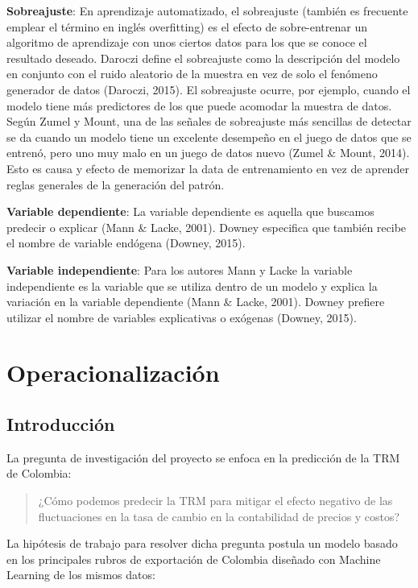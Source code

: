 \textbf{Sobreajuste}: En aprendizaje automatizado, el sobreajuste (también es frecuente emplear el término en inglés overfitting) es el efecto de sobre-entrenar un algoritmo de aprendizaje con unos ciertos datos para los que se conoce el resultado deseado. Daroczi define el sobreajuste como la descripción del modelo en conjunto con el ruido aleatorio de la muestra en vez de solo el fenómeno generador de datos (Daroczi, 2015). El sobreajuste ocurre, por ejemplo, cuando el modelo tiene más predictores de los que puede acomodar la muestra de datos. Según Zumel y Mount, una de las señales de sobreajuste más sencillas de detectar se da cuando un modelo tiene un excelente desempeño en el juego de datos que se entrenó, pero uno muy malo en un juego de datos nuevo (Zumel \& Mount, 2014). Esto es causa y efecto de memorizar la data de entrenamiento en vez de aprender reglas generales de la generación del patrón.
 
\textbf{Variable dependiente}: La variable dependiente es aquella que buscamos predecir o explicar (Mann \& Lacke, 2001). Downey especifica que también recibe el nombre de variable endógena (Downey, 2015).
 
\textbf{Variable independiente}: Para los autores Mann y Lacke la variable independiente es la variable que se utiliza dentro de un modelo y explica la variación en la variable dependiente (Mann \& Lacke, 2001). Downey prefiere utilizar el nombre de variables explicativas o exógenas (Downey, 2015).

\section{Operacionalización}
\subsection{Introducción}
La pregunta de investigación del proyecto se enfoca en la predicción de la TRM de Colombia:

\begin{quote}
¿Cómo podemos predecir la TRM para mitigar el efecto negativo de las fluctuaciones en la tasa de cambio en la contabilidad de precios y costos? 
\end{quote}

La hipótesis de trabajo para resolver dicha pregunta postula un modelo basado en los principales rubros de exportación de Colombia diseñado con Machine Learning de los mismos datos:

